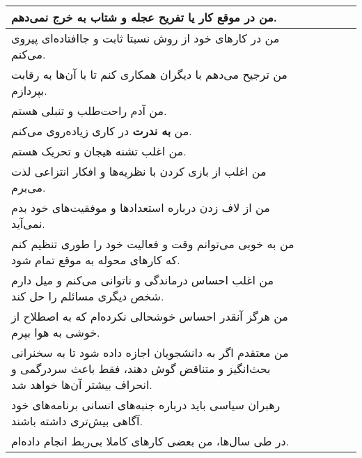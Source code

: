\documentclass[a4paper,10pt]{article}
\begin{document}
\begin{center}
\begin{tabular}{|p{6cm}|c|c|c|c|c|}
من در موقع کار یا تفریح عجله و شتاب \textbf{به خرج نمی‌دهم.}& & & & & \\
\hline

من در کارهای خود از روش نسبتا ثابت و جاافتاده‌ای پیروی می‌کنم.& & & & & \\
\hline

من ترجیح می‌دهم با دیگران همکاری کنم تا با آن‌ها به رقابت بپردازم.& & & & & \\
\hline

من آدم راحت‌طلب و تنبلی هستم.& & & & & \\
\hline

من \textbf{به ندرت} در کاری زیاده‌روی می‌کنم.& & & & & \\
\hline

من اغلب تشنه هیجان و تحریک هستم.& & & & & \\
\hline

من اغلب از بازی کردن با نظریه‌ها و افکار انتزاعی لذت می‌برم.& & & & & \\
\hline

من از لاف زدن درباره استعداد‌ها و موفقیت‌های خود بدم نمی‌آید.& & & & & \\
\hline 

من به خوبی می‌توانم وقت و فعالیت خود را طوری تنظیم کنم که کارهای محوله به موقع تمام شود.& & & & & \\
\hline

من اغلب احساس درماندگی و ناتوانی می‌کنم و میل دارم شخص دیگری مسائلم را حل کند.& & & & & \\
\hline

من هرگز آنقدر احساس خوشحالی نکرده‌ام که به اصطلاح از خوشی به هوا بپرم.& & & & & \\
\hline

من معتقدم اگر به دانشجویان اجازه داده شود تا به سخنرانی بحث‌انگیز و متناقض گوش دهند، فقط باعث سردرگمی و انحراف بیشتر آن‌ها خواهد شد.& & & & & \\
\hline

رهبران سیاسی باید درباره جنبه‌های انسانی برنامه‌های خود آگاهی بیش‌تری داشته باشند.& & & & & \\
\hline

در طی سال‌ها، من بعضی کارهای کاملا بی‌ربط انجام داده‌ام.& & & & &\\
\hline
\end{tabular}
\end{center}
\end{document}
